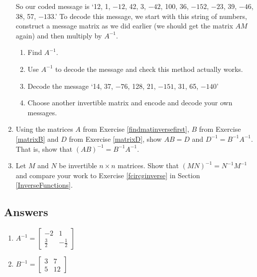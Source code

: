 \documentclass{ximera}
\begin{document}
\begin{enumerate}
So our coded message is `12, 1, $-12$, 42, 3, $-42$, 100, 36, $-152$, $-23$, 39, $-46$, 38, 57, $-133$.'  To decode this message, we start with this string of numbers, construct a message matrix as we did earlier (we should get the matrix $AM$ again) and then multiply by $A^{-1}$.

\begin{enumerate}

\item  Find $A^{-1}$.

\item  Use $A^{-1}$ to decode the message and check this method actually works.

\item  Decode the message `14, 37, $-76$, 128, 21, $-151$, 31, 65, $-140$'

\item  Choose another invertible matrix and encode and decode your own messages.

\end{enumerate}

\item Using the matrices $A$ from Exercise \ref{findmatinversefirst}, $B$ from Exercise \ref{matrixB} and $D$ from Exercise \ref{matrixD}, show $AB = D$ and  $D^{-1} = B^{-1}A^{-1}$.  That is, show that $(AB)^{-1} = B^{-1}A^{-1}$. 

\item Let $M$ and $N$ be invertible $n \times n$ matrices.  Show that $(MN)^{-1} = N^{-1}M^{-1}$ and compare your work to Exercise \ref{fcircginverse} in Section \ref{InverseFunctions}.


\end{enumerate}

\newpage

\subsection{Answers}

\begin{multicols}{2} 
\begin{enumerate}


\item $A^{-1} = \left[ \begin{array}{rr} -2 & 1 \\[3pt] \frac{3}{2} & -\frac{1}{2} \end{array} \right]$
\item $B^{-1} = \left[ \begin{array}{rr} 3 & 7 \\ 5 & 12 \end{array} \right]$

\setcounter{HW}{\value{enumi}}
\end{enumerate}
\end{multicols}
\end{document}
